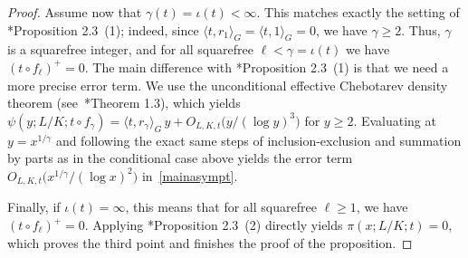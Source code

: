 \documentclass[12pt]{amsart}
\numberwithin{equation}{section}
\theoremstyle{definition}
\theoremstyle{remark}
\begin{document}
\begin{proof}
Assume now that $\gamma(t)=\iota(t)<\infty$. This matches exactly the setting of \cite{Hay}*{Proposition 2.3~(1)}; indeed, since $\langle t,r_1\rangle_G=\langle t,1\rangle_G=0$, we have $\gamma\ge 2$. Thus, $\gamma$ is a squarefree integer, and for all squarefree $\ell<\gamma=\iota(t)$ we have $(t\circ f_\ell)^+=0$. The main difference with \cite{Hay}*{Proposition 2.3~(1)} is that we need a more precise error term. We use the unconditional effective Chebotarev density theorem (see~\cite{LO}*{Theorem 1.3}), which yields $\psi(y; L/K; t\circ f_\gamma) = \langle t, r_\gamma \rangle_G\, y + O_{L,K,t}\big(y/(\log y)^3\big)$ for $y \ge 2$. Evaluating at $y = x^{1/\gamma}$ and following the exact same steps of inclusion-exclusion and summation by parts as in the conditional case above yields the error term $O_{L,K,t}\big(x^{1/\gamma}/(\log x)^2\big)$ in~\eqref{mainasympt}.

Finally, if $\iota(t) = \infty$, this means that for all squarefree $\ell\ge 1$, we have $(t\circ f_\ell)^+=0$. Applying \cite{Hay}*{Proposition 2.3~(2)} directly yields $\pi(x;L/K;t)=0$, which proves the third point and finishes the proof of the proposition.
\end{proof}
\end{document}
